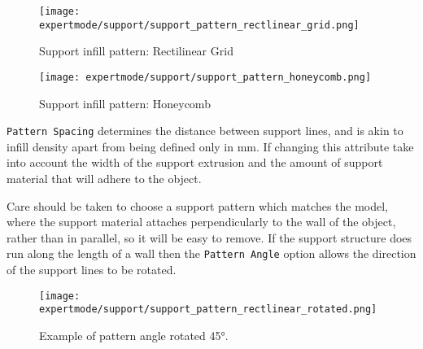 \begin{figure}[H]
\centering
\texttt{[image: expertmode/support/support\_pattern\_rectlinear\_grid.png]}
\caption{Support infill pattern: Rectilinear Grid}
\label{fig:support_pattern_rectlinear_grid}
\end{figure}

\begin{figure}[H]
\centering
\texttt{[image: expertmode/support/support\_pattern\_honeycomb.png]}
\caption{Support infill pattern: Honeycomb}
\label{fig:support_pattern_honeycomb}
\end{figure}

\texttt{Pattern Spacing} determines the distance between support lines, and is akin to infill density apart from being defined only in mm.  If changing this attribute take into account the width of the support extrusion and the amount of support material that will adhere to the object.

Care should be taken to choose a support pattern which matches the model, where the support material attaches perpendicularly to the wall of the object, rather than in parallel, so it will be easy to remove.  If the support structure does run along the length of a wall then the \texttt{Pattern Angle} option allows the direction of the support lines to be rotated.

\begin{figure}[H]
\centering
\texttt{[image: expertmode/support/support\_pattern\_rectlinear\_rotated.png]}
\caption{Example of pattern angle rotated 45°.}
\label{fig:support_pattern_rectlinear_rotated}
\end{figure}




